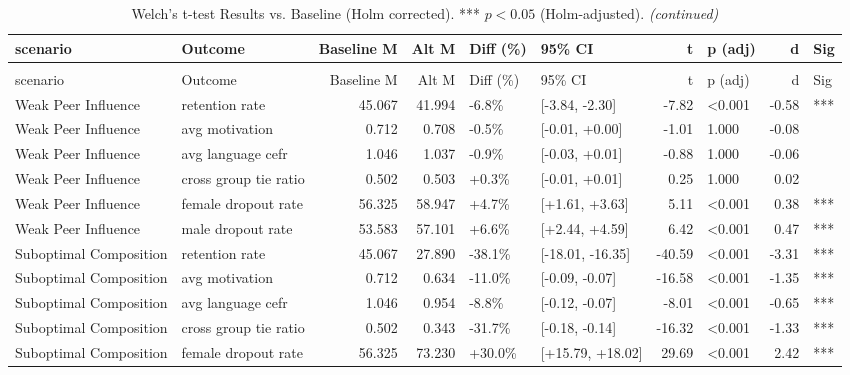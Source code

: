\begingroup\fontsize{8}{10}\selectfont

\begin{longtable}[t]{llrrllrlrl}
\caption{Welch's t-test Results vs. Baseline (Holm corrected). *** $p<0.05$ (Holm-adjusted).}\\
\toprule
scenario & Outcome & Baseline M & Alt M & Diff (\%) & 95\% CI & t & p (adj) & d & Sig\\
\midrule
\endfirsthead
\caption[]{Welch's t-test Results vs. Baseline (Holm corrected). *** $p<0.05$ (Holm-adjusted). \textit{(continued)}}\\
\toprule
scenario & Outcome & Baseline M & Alt M & Diff (\%) & 95\% CI & t & p (adj) & d & Sig\\
\midrule
\endhead

\endfoot
\bottomrule
\endlastfoot
Weak Peer Influence & retention rate & 45.067 & 41.994 & -6.8\% & {}[-3.84, -2.30] & -7.82 & <0.001 & -0.58 & ***\\
Weak Peer Influence & avg motivation & 0.712 & 0.708 & -0.5\% & {}[-0.01, +0.00] & -1.01 & 1.000 & -0.08 & \\
Weak Peer Influence & avg language cefr & 1.046 & 1.037 & -0.9\% & {}[-0.03, +0.01] & -0.88 & 1.000 & -0.06 & \\
Weak Peer Influence & cross group tie ratio & 0.502 & 0.503 & +0.3\% & {}[-0.01, +0.01] & 0.25 & 1.000 & 0.02 & \\
Weak Peer Influence & female dropout rate & 56.325 & 58.947 & +4.7\% & {}[+1.61, +3.63] & 5.11 & <0.001 & 0.38 & ***\\
\addlinespace
Weak Peer Influence & male dropout rate & 53.583 & 57.101 & +6.6\% & {}[+2.44, +4.59] & 6.42 & <0.001 & 0.47 & ***\\
Suboptimal Composition & retention rate & 45.067 & 27.890 & -38.1\% & {}[-18.01, -16.35] & -40.59 & <0.001 & -3.31 & ***\\
Suboptimal Composition & avg motivation & 0.712 & 0.634 & -11.0\% & {}[-0.09, -0.07] & -16.58 & <0.001 & -1.35 & ***\\
Suboptimal Composition & avg language cefr & 1.046 & 0.954 & -8.8\% & {}[-0.12, -0.07] & -8.01 & <0.001 & -0.65 & ***\\
Suboptimal Composition & cross group tie ratio & 0.502 & 0.343 & -31.7\% & {}[-0.18, -0.14] & -16.32 & <0.001 & -1.33 & ***\\
\addlinespace
Suboptimal Composition & female dropout rate & 56.325 & 73.230 & +30.0\% & {}[+15.79, +18.02] & 29.69 & <0.001 & 2.42 & ***\\

\end{longtable}
